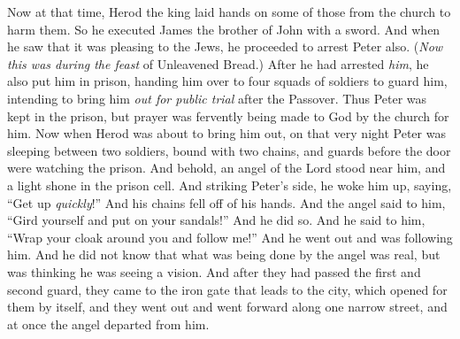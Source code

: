 \begin{biblechapter} %
 Now at that time, Herod the king laid hands on some of those from the church to harm them.
\verse So he executed James the brother of John with a sword.
\verse And when he saw that it was pleasing to the Jews, he proceeded to arrest Peter also. (\textit{Now this was during the feast} of Unleavened Bread.)
\verse After he had arrested \textit{him}, he also put him in prison, handing him over to four squads of soldiers to guard him, intending to bring him \textit{out for public trial} after the Passover.
\verse Thus Peter was kept in the prison, but prayer was fervently being made to God by the church for him.
 Now when Herod was about to bring him out, on that very night Peter was sleeping between two soldiers, bound with two chains, and guards before the door were watching the prison.
\verse And behold, an angel of the Lord stood near him, and a light shone in the prison cell. And striking Peter’s side, he woke him up, saying, “Get up \textit{quickly}!” And his chains fell off of his hands.
\verse And the angel said to him, “Gird yourself and put on your sandals!” And he did so. And he said to him, “Wrap your cloak around you and follow me!”
\verse And he went out and was following him. And he did not know that what was being done by the angel was real, but was thinking he was seeing a vision.
\verse And after they had passed the first and second guard, they came to the iron gate that leads to the city, which opened for them by itself, and they went out and went forward along one narrow street, and at once the angel departed from him.

\end{biblechapter}

